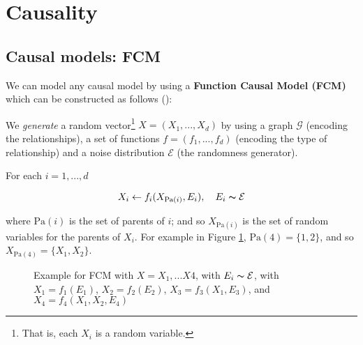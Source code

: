 \section{Causality}

\subsection{Causal models: FCM}

We can model any causal model by using a \textbf{Function Causal Model (FCM)} which can be constructed as follows
(\cite{Peters2017}):

We \textit{generate} a random vector\footnote{That is, each $X_i$ is a random variable.}
$X = (X_1, ..., X_d)$ by using a graph $\mathcal{G}$ (encoding the relationships),
a set of functions $f = (f_1, ..., f_d)$ (encoding the type of relationship) and a noise distribution $\mathcal{E}$
(the randomness generator).

For each $i = 1, ..., d$

$$
    X_i \leftarrow f_i(X_{\text{Pa}(i)}, E_i), \quad E_i \thicksim \mathcal{E}
$$

where $\text{Pa}(i)$ is the set of parents of $i$; and so $X_{\text{Pa}(i)}$ is the set of random variables
for the parents of $X_i$. For example in Figure \ref{fig:fcm_1}, $\text{Pa}(4) = \{1, 2\}$, 
and so $X_{\text{Pa}(4)} = \{X_1, X_2\}$.

\begin{figure}[!h]
    \centering

    \caption{ Example for FCM with $X = X_1, ... X4$, with $E_i \thicksim \mathcal{E}$, 
    with $X_1 = f_1(E_1)$, $X_2 = f_2(E_2)$, $X_3 = f_3(X_1, E_3)$, and 
    $X_4 = f_4(X_1, X_2, E_4)$}
    \label{fig:fcm_1}

\end{figure}


